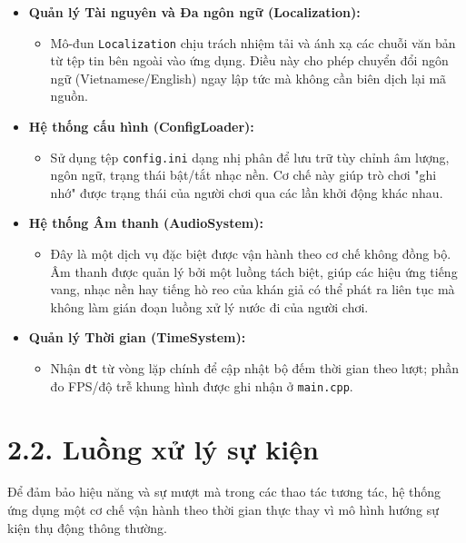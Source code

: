 \begin{itemize}
    \item \textbf{Quản lý Tài nguyên và Đa ngôn ngữ (Localization):}
    \begin{itemize}
        \item Mô-đun \texttt{Localization} chịu trách nhiệm tải và ánh xạ các chuỗi văn bản từ tệp tin bên ngoài vào ứng dụng. Điều này cho phép chuyển đổi ngôn ngữ (Vietnamese/English) ngay lập tức mà không cần biên dịch lại mã nguồn.
    \end{itemize}

    \item \textbf{Hệ thống cấu hình (ConfigLoader):}
    \begin{itemize}
        \item Sử dụng tệp \texttt{config.ini} dạng nhị phân để lưu trữ tùy chỉnh âm lượng, ngôn ngữ, trạng thái bật/tắt nhạc nền. Cơ chế này giúp trò chơi "ghi nhớ" được trạng thái của người chơi qua các lần khởi động khác nhau.
    \end{itemize}

    \item \textbf{Hệ thống Âm thanh (AudioSystem):}
    \begin{itemize}
        \item Đây là một dịch vụ đặc biệt được vận hành theo cơ chế không đồng bộ. Âm thanh được quản lý bởi một luồng tách biệt, giúp các hiệu ứng tiếng vang, nhạc nền hay tiếng hò reo của khán giả có thể phát ra liên tục mà không làm gián đoạn luồng xử lý nước đi của người chơi.
    \end{itemize}

    \item \textbf{Quản lý Thời gian (TimeSystem):}
    \begin{itemize}
        \item Nhận \texttt{dt} từ vòng lặp chính để cập nhật bộ đếm thời gian theo lượt; phần đo FPS/độ trễ khung hình được ghi nhận ở \texttt{main.cpp}.
    \end{itemize}
\end{itemize}

\section*{2.2. Luồng xử lý sự kiện}

\noindent \indent Để đảm bảo hiệu năng và sự mượt mà trong các thao tác tương tác, hệ thống ứng dụng một cơ chế vận hành theo thời gian thực thay vì mô hình hướng sự kiện thụ động thông thường.

